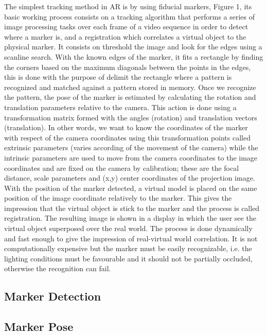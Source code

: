 The simplest tracking method in AR is by using fiducial markers, Figure 1, its basic working process consists on a tracking algorithm that performs a series of image processing tasks over each frame of a video sequence in order to detect where a marker is, and a registration which correlates a virtual object to the physical marker\cite{krevelen2010}. It consists on threshold the image and look for the edges using a scanline search. With the known edges of the marker, it fits a rectangle by finding the corners based on the maximum diagonals between the points in the edges, this is done with the purpose of delimit the rectangle where a pattern is recognized and matched against a pattern stored in memory. Once we recognize the pattern, the pose of the marker is estimated by calculating the rotation and translation parameters relative to the camera. This action is done using a transformation matrix formed with the angles (rotation) and translation vectors (translation). In other words, we want to know the coordinates of the marker with respect of the camera coordinates using this transformation points called extrinsic parameters (varies according of the movement of the camera) while the intrinsic parameters are used to move from the camera coordinates to the image coordinates and are fixed on the camera by calibration; these are the focal distance, scale parameters and (x,y) center coordinates of the projection image. With the position of the marker detected, a virtual model is placed on the same position of the image coordinate relatively to the marker. This gives the impression that the virtual object is stick to the marker and the process is called registration. The resulting image is shown in a display in which the user see the virtual object superposed over the real world. The process is done dynamically and fast enough to give the impression of real-virtual world correlation. It is not computationally expensive but the marker must be easily recognizable, i.e. the lighting conditions must be favourable and it should not be partially occluded, otherwise the recognition can fail.

    



\subsection{Marker Detection}


\subsection{Marker Pose}



